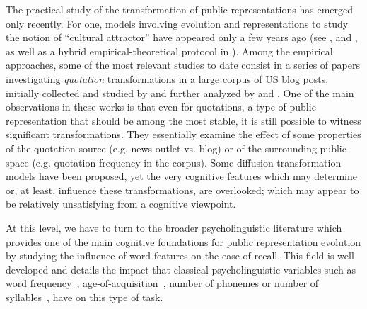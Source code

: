 The practical study of the transformation of public representations has emerged only recently.
For one, models involving evolution and representations to study the notion of ``cultural attractor'' have appeared only a few years ago (see \citealp{Claidiere07}, and \citealp{claidiere2014darwinian}, as well as a hybrid empirical-theoretical protocol in \citealp{maccallum2012evolution}).
Among the empirical approaches, some of the most relevant studies to date consist in a series of papers investigating \emph{quotation} transformations in a large corpus of US blog posts, initially collected and studied by \citet{Leskovec09} and further analyzed by \citet{Simmons11} and \citet{omod-mult}.
One of the main observations in these works is that even for quotations, a type of public representation that should be among the most stable, it is still possible to witness significant transformations. They essentially examine the effect of some properties of the quotation source (\hbox{e.g.} news outlet {vs.} blog) or of the surrounding public space (\hbox{e.g.} quotation frequency in the corpus). Some diffusion-transformation models have been proposed, yet the very cognitive features which may determine or, at least, influence these transformations, are overlooked; which may appear to be relatively unsatisfying from a cognitive viewpoint.


At this level, we have to turn to the broader psycholinguistic literature which provides one of the main cognitive foundations for public representation evolution by studying the influence of word features on the ease of recall.
This field is well developed and details the impact that classical psycholinguistic variables such as word frequency~\citep[see][for a review]{Yonelinas02}, age-of-acquisition~\citep{Zevin02}, number of phonemes or number of syllables~\citep[see for instance][]{Rey98,nick-diss}, have on this type of task.

